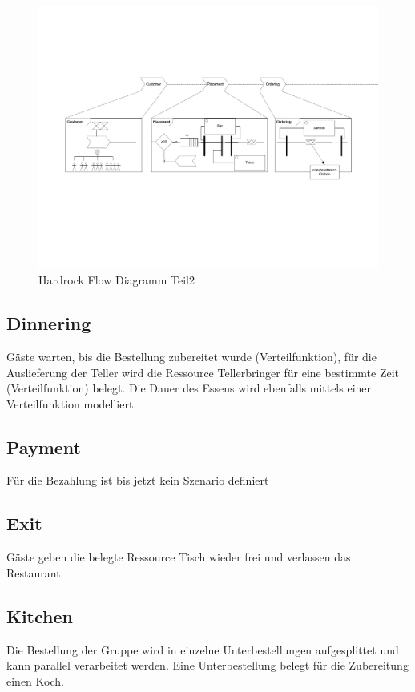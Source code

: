 \documentclass[ngerman,a4paper,12pt]{scrreprt}
\begin{document}
\begin{landscape}
		\begin{figure}[H]
				\includegraphics[page=2,trim=0cm 7cm 2cm 5cm, clip=true,width=1.4\textwidth]{../model/Modell_v2.pdf}
				\caption[Hardrock Flow Diagramm Teil2]{Hardrock Flow Diagramm Teil2}
				\label{flowDiagramm2}
		\end{figure}
		
		\subsection{Dinnering}
		Gäste warten, bis die Bestellung zubereitet wurde (Verteilfunktion), für die Auslieferung der Teller wird die Ressource Tellerbringer für eine bestimmte Zeit (Verteilfunktion) belegt. Die Dauer des Essens wird ebenfalls mittels einer Verteilfunktion modelliert.
		
		\subsection{Payment}
		Für die Bezahlung ist bis jetzt kein Szenario definiert
		
		\subsection{Exit}
		Gäste geben die belegte Ressource Tisch wieder frei und verlassen das Restaurant.
		
		\subsection{Kitchen}
		Die Bestellung der Gruppe wird in einzelne Unterbestellungen aufgesplittet und kann parallel verarbeitet werden. Eine Unterbestellung belegt für die Zubereitung einen Koch.
		

\end{landscape}
\end{document}
